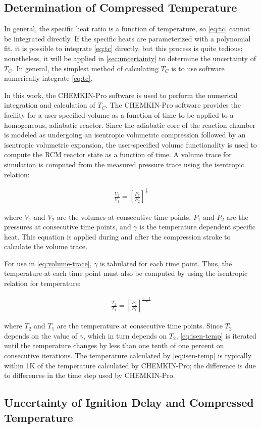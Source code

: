 \documentclass[12pt, letterpaper]{article}
\begin{document}
\subsection{Determination of Compressed Temperature}

In general, the specific heat ratio is a function of temperature, so
\autoref{eq:tc} cannot be integrated directly. If the specific heats
are parameterized with a polynomial fit, it is possible to integrate
\autoref{eq:tc} directly, but this process is quite tedious; nonetheless,
it will be applied in \autoref{sec:uncertainty} to determine the uncertainty
of $T_C$. In general, the simplest method of calculating $T_C$ is to use
software numerically integrate \autoref{eq:tc}.

In this work, the CHEMKIN-Pro \cite{Chemkin2012} software is used to
perform the numerical integration and calculation of $T_C$. The
CHEMKIN-Pro software provides the facility for a user-specified
volume as a function of time to be applied to a homogeneous,
adiabatic reactor. Since the adiabatic core of the reaction chamber
is modeled as undergoing an isentropic volumetric compression followed
by an isentropic volumetric expansion, the user-specified volume
functionality is used to compute the RCM reactor state as a function
of time. A volume trace for simulation is computed from the measured
pressure trace using the isentropic relation:

\begin{align}
\frac{V_2}{V_1} = \left[\frac{P_1}{P_2}\right]^{\frac{1}{\gamma}}
\label{eq:volume-trace}
\end{align}

\noindent
where $V_1$ and $V_2$ are the volumes at consecutive time points,
$P_1$ and $P_2$ are the pressures at consecutive time points, and
$\gamma$ is the temperature dependent specific heat. This equation
is applied during and after the compression stroke to calculate
the volume trace. 

For use in \autoref{eq:volume-trace}, $\gamma$ is tabulated for each
time point. Thus, the temperature at each time point must also be
computed by using the isentropic relation for temperature:

\begin{align}
\frac{T_2}{T_1} = \left[\frac{P_2}{P_1}\right]^{\frac{\gamma-1}{\gamma}}
\label{eq:isen-temp}
\end{align}

\noindent
where $T_2$ and $T_1$ are the temperature at consecutive time points.
Since $T_2$ depends on the value of $\gamma$, which in turn depends
on $T_2$, \autoref{eq:isen-temp} is iterated until the temperature
changes by less than one tenth of one percent on consecutive iterations.
The temperature calculated by \autoref{eq:isen-temp} is typically within
1K of the temperature calculated by CHEMKIN-Pro; the difference is due
to differences in the time step used by CHEMKIN-Pro.


\subsection{Uncertainty of Ignition Delay and Compressed Temperature}
\label{sec:uncertainty}
\end{document}
